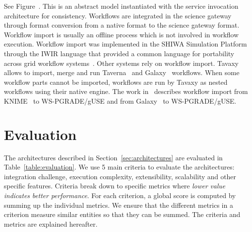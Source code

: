 \documentclass[preprint,3p,twocolumn]{elsarticle}
\newcommand{\note}[2]{\pdfmargincomment[color=yellow,author=#1,open=true]{#2}}
\newcommand{\closednote}[4]{} %
\begin{document}
See Figure~. This is an abstract model
instantiated with the service invocation architecture for
consistency. Workflows are integrated in the science gateway through
format conversion from a native format to the science gateway
format. Workflow import is usually an offline process which is not
involved in workflow execution. Workflow import was implemented in the
SHIWA Simulation Platform through the IWIR language that provided a
common language for portability across grid workflow
systems~\cite{plankensteiner-prodan-etal:2013}.  Other systems rely on
workflow import. Tavaxy~\cite{Abouelhoda2012} allows to import, merge
and run Taverna~\cite{oinn2004taverna} and
Galaxy~\cite{goecks2010galaxy} workflows. When some workflow parts
cannot be imported, workflows are run by Tavaxy as nested workflows
using their native engine. The work in~\cite{delaGarza2016} describes
workflow import from KNIME~\cite{Berthold2008} to WS-PGRADE/gUSE and
from Galaxy~\cite{goecks2010galaxy} to WS-PGRADE/gUSE.
\closednote{Tristan}{Add description of a real system}{Tristan}{Would
  require to reproduce a figure from another paper. The concept seems
  simple enough to not require a figure.}


\section{Evaluation}

\label{sec:evaluation}

The architectures described in Section~\ref{sec:architectures} are
evaluated in Table~\ref{table:evaluation}. We use 5 main criteria to
evaluate the architectures: integration challenge, execution complexity,
extensibility, scalability and other specific features. Criteria break
down to specific metrics where \emph{lower value indicates better
  performance}. For each criterion, a global score is computed by
summing up the individual metrics. We ensure that the different
metrics in a criterion measure similar entities so that they can be
summed. The criteria and metrics are explained hereafter.
\end{document}
